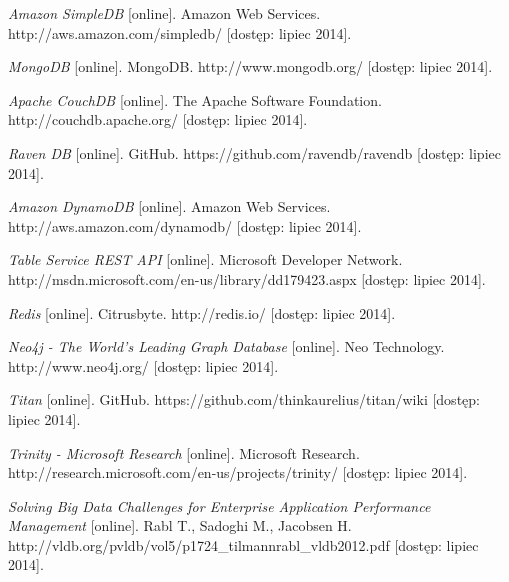 \begin{thebibliography}{}
  \emph{Amazon SimpleDB} [online].
  Amazon Web Services.
  http://aws.amazon.com/simpledb/ [dostęp: lipiec 2014].
 
  \emph{MongoDB} [online].
  MongoDB.
  http://www.mongodb.org/ [dostęp: lipiec 2014].
 
  \emph{Apache CouchDB} [online].
  The Apache Software Foundation.
  http://couchdb.apache.org/ [dostęp: lipiec 2014].
 
  \emph{Raven DB} [online].
  GitHub.
  https://github.com/ravendb/ravendb [dostęp: lipiec 2014].
 
  \emph{Amazon DynamoDB} [online].
  Amazon Web Services.
  http://aws.amazon.com/dynamodb/ [dostęp: lipiec 2014].
 
  \emph{Table Service REST API} [online].
  Microsoft Developer Network.
  http://msdn.microsoft.com/en-us/library/dd179423.aspx [dostęp: lipiec 2014].
 
  \emph{Redis} [online].
  Citrusbyte.
  http://redis.io/ [dostęp: lipiec 2014].
 
  \emph{Neo4j - The World's Leading Graph Database} [online].
  Neo Technology.
  http://www.neo4j.org/ [dostęp: lipiec 2014].
 
  \emph{Titan} [online].
  GitHub.
  https://github.com/thinkaurelius/titan/wiki [dostęp: lipiec 2014].
 
  \emph{Trinity - Microsoft Research} [online].
  Microsoft Research.
  http://research.microsoft.com/en-us/projects/trinity/ [dostęp: lipiec 2014].
 
  \emph{Solving Big Data Challenges for Enterprise Application Performance Management} [online].
  Rabl T., Sadoghi M., Jacobsen H.
  http://vldb.org/pvldb/vol5/p1724\_tilmannrabl\_vldb2012.pdf [dostęp: lipiec 2014].
  
\end{thebibliography}
